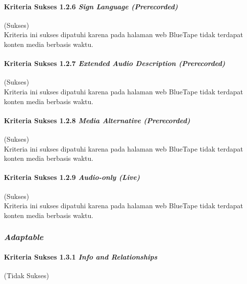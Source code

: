 \documentclass[a4paper,twoside]{article}
\begin{document}
\begin{enumerate}
		\paragraph{Kriteria Sukses 1.2.6 \textit{Sign Language (Prerecorded)}}
		\label{par:kepatuhan_bluetape_kriteria_sukses_1.2.6}
		(Sukses)\\

		Kriteria ini sukses dipatuhi karena pada halaman web BlueTape tidak terdapat konten media berbasis waktu.

		\paragraph{Kriteria Sukses 1.2.7 \textit{Extended Audio Description (Prerecorded)}}
		\label{par:kepatuhan_bluetape_kriteria_sukses_1.2.7}
		(Sukses)\\

		Kriteria ini sukses dipatuhi karena pada halaman web BlueTape tidak terdapat konten media berbasis waktu.

		\paragraph{Kriteria Sukses 1.2.8 \textit{Media Alternative (Prerecorded)}}
		\label{par:kepatuhan_bluetape_kriteria_sukses_1.2.8}
		(Sukses)\\

		Kriteria ini sukses dipatuhi karena pada halaman web BlueTape tidak terdapat konten media berbasis waktu.

		\paragraph{Kriteria Sukses 1.2.9 \textit{Audio-only (Live)}}
		\label{par:kepatuhan_bluetape_kriteria_sukses_1.2.9}
		(Sukses)\\

		Kriteria ini sukses dipatuhi karena pada halaman web BlueTape tidak terdapat konten media berbasis waktu.

		\subsubsection*{\textit{Adaptable}}
		\label{subsubsec:kepatuhan_bluetape_adaptable}

		\paragraph{Kriteria Sukses 1.3.1 \textit{Info and Relationships}}
		\label{par:kepatuhan_bluetape_kriteria_sukses_1.3.1}
		(Tidak Sukses)\\


\end{enumerate}
\end{document}
